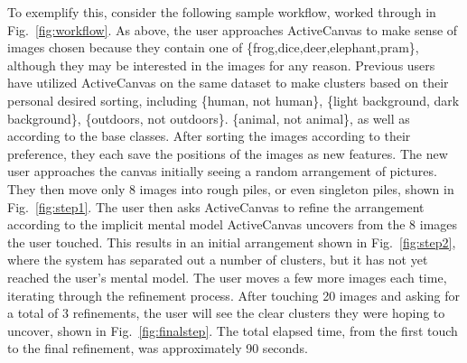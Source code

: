 \documentclass[journal]{vgtc}
\newcommand{\remove}[1]{}
\begin{document}
\remove{Lazy user L1 (Fig.~\ref{fig:L1}) attempts to follow the same strategy as User 1, but does not adequately separate the clusters to create distinct dividing surfaces between clusters.  Similarly, lazy user L2 attempts to follow the same strategy as User 2, but instead of following the same distinct clustering as User 2, L2 chooses a different clustering topology and roughly places animals on the inside and inanimate objects in an outside ring  surrounding the animals (but, again without creating clear separation between the two). Note that L2 has chosen to (sloppily) arrange their canvas in a different topology; User 2 made two distinct clusters, but L2 chose to make a bullseye pattern.  The mutual information measure enables ActiveCanvas to identify the user's mental model, without new users understanding or known previous user's arrangements.

The system compares L1's positions to the combined features generated by User 1 and User 2.  Based on the innate image features and similarity to the features generated by User 1, the system correctly identified the desired mental model of Lazy user L1, shown in Fig.~\ref{fig:L1final}, as well as the mental model of Lazy user L2, shown in Fig.~\ref{fig:L2final}. Thus, the value of ActiveCanvas lies in its ability to capture a user's mental model from minimal interaction from the user.
}

To exemplify this, consider the following sample workflow, worked through in Fig.~\ref{fig:workflow}.  As above, the user approaches ActiveCanvas to make sense of images chosen because they contain one of \{frog,dice,deer,elephant,pram\}, although they may be interested in the images for any reason.  Previous users have utilized ActiveCanvas on the same dataset to make clusters based on their personal desired sorting, including \{human, not human\}, \{light background, dark background\}, \{outdoors, not outdoors\}. \{animal, not animal\}, as well as according to the base classes.  After sorting the images according to their preference, they each save the positions of the images as new features. The new user approaches the canvas initially seeing a random arrangement of pictures.  They then move only 8 images into rough piles, or even singleton piles, shown in Fig.~\ref{fig:step1}.  The user then asks ActiveCanvas to refine the arrangement according to the implicit mental model ActiveCanvas uncovers from the 8 images the user touched. This results in an initial arrangement shown in Fig.~\ref{fig:step2}, where the system has separated out a number of clusters, but it has not yet reached the user's mental model.  The user moves a few more images each time, iterating through the refinement process.  After touching 20 images and asking for a total of 3 refinements, the user will see the clear clusters they were hoping to uncover, shown in Fig.~\ref{fig:finalstep}. The total elapsed time, from the first touch to the final refinement, was approximately 90 seconds.  
\end{document}
